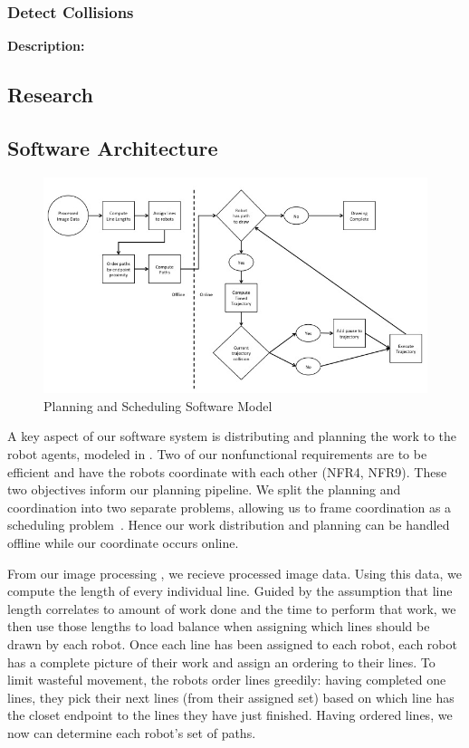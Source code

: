 \subsubsection{Detect Collisions}
\textbf{Description:}  


\subsection{Research}

\subsection{Software Architecture}
\label{sec:sw_arch_planner}

\begin{figure}[h!]
 \centering
  \includegraphics[width=0.99\columnwidth]{diagrams/sw_arch_planning.jpg}
	\caption{Planning and Scheduling Software Model}
 \label{fig:planning_processing}
\end{figure}

A key aspect of our software system is distributing and planning the work to the robot agents, modeled in .
Two of our nonfunctional requirements are to be efficient and have the robots coordinate with each other (NFR4, NFR9). These two objectives inform our planning pipeline. We split the planning and coordination into two separate problems, allowing us to frame coordination as a scheduling problem~\cite{o1989deadlock}. Hence our work distribution and planning can be handled offline while our coordinate occurs online. 

From our image processing , we recieve processed image data. 
Using this data, we compute the length of every individual line. 
Guided by the assumption that line length correlates to amount of work done and the time to perform that work, we then use those lengths to load balance when assigning which lines should be drawn by each robot. 
Once each line has been assigned to each robot, each robot has a complete picture of their work and assign an ordering to their lines. 
To limit wasteful movement, the robots order lines greedily: having completed one lines, they pick their next lines (from their assigned set) based on which line has the closet endpoint to the lines they have just finished. 
Having ordered lines, we now can determine each robot's set of paths. 

